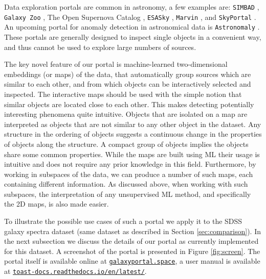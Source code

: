 \documentclass[fleqn,usenatbib]{mnras}
\newcommand{\manu}{\href{https://toast-docs.readthedocs.io/en/latest/}{\texttt{toast-docs.readthedocs.io/en/latest/}}}
\newcommand{\gtoast}{\href{https://galaxyportal.space/}{\texttt{galaxyportal.space}}}
\begin{document}
{Data exploration portals are common in astronomy, a few examples are: \texttt{SIMBAD} \citep{wenger00},  \texttt{Galaxy Zoo} \citep{lintott08}, The Open Supernova Catalog \citep{guillochon17}, \texttt{ESASky} \citep{baines17}, \texttt{Marvin} \citep{cherinka18},   and \texttt{SkyPortal} \citep{walt19}. An upcoming portal for anomaly  detection in astronomical data is \texttt{Astronomaly} \citep{lochner}. These portals are generally designed to inspect single objects in a convenient way, and  thus cannot be used to explore large numbers of sources. 

The key novel feature of our portal is  machine-learned  two-dimensional embeddings (or maps) of the data, that automatically group sources which are similar to each other, and from which objects can be interactively selected and inspected. The interactive maps should be used with the simple notion that similar objects  are located close to each other.     This makes detecting potentially interesting phenomena quite intuitive. Objects that are isolated on a map are interpreted as objects that are not similar to any other object in the dataset. Any structure in the ordering of objects suggests a continuous change in the properties of objects along the structure. A compact group of objects implies the objects share some common properties. While the maps are built using ML their usage is intuitive and does not require any prior knowledge in this field. Furthermore, by working in subspaces of the data, we can produce a number of such maps, each containing different information.  As discussed above, when working with  such subspaces, the interpretation of  any unsupervised ML method, and specifically the 2D maps,  is also made easier. 

 To illustrate the possible use cases of such a portal we apply it to the SDSS galaxy spectra dataset (same dataset as described in Section \ref{sec:comparison}). In the next subsection we discuss the details of our portal as currently implemented for this dataset. A screenshot of the portal is presented in Figure \ref{fig:screen}. The portal itself is available online at \gtoast, a user manual is available at \manu{}. 



}
\end{document}
